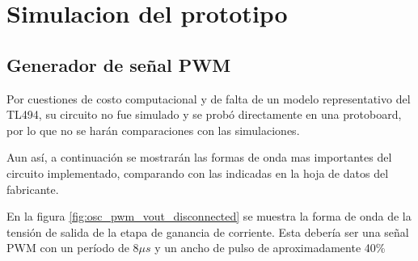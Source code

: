\section{Simulacion del prototipo}


\subsection{Generador de señal PWM}

Por cuestiones de costo computacional y de falta de un modelo representativo del TL494,
su circuito no fue simulado y se probó directamente en una protoboard,
por lo que no se harán comparaciones con las simulaciones.

Aun así, a continuación se mostrarán las formas de onda mas importantes del circuito implementado,
comparando con las indicadas en la hoja de datos del fabricante.

En la figura \ref{fig:osc_pwm_vout_disconnected} se muestra la forma de onda de la tensión de salida de la etapa de ganancia de corriente.
Esta debería ser una señal PWM con un período de $8\mu s$ y un ancho de pulso de aproximadamente 40\%

